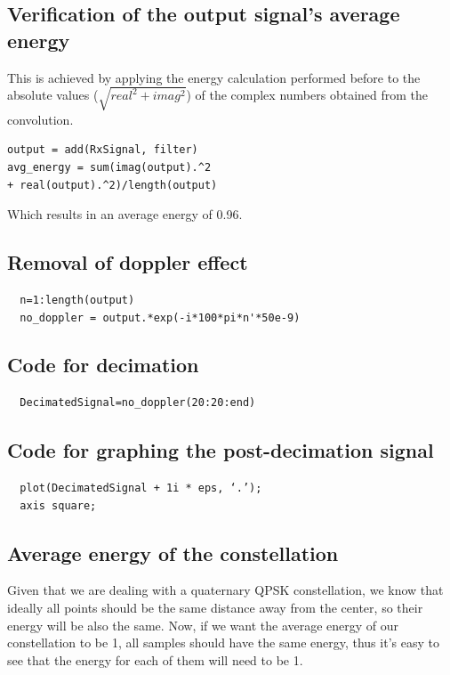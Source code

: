 \documentclass[conference,9pt]{IEEEtran}
\begin{document}
\subsection{Verification of the output signal's average energy}
This is achieved by applying the energy calculation performed before to the absolute values ($\sqrt{real^2+imag^2}$) of the complex numbers obtained from the convolution.

\begin{verbatim}
output = add(RxSignal, filter)
avg_energy = sum(imag(output).^2 
+ real(output).^2)/length(output)
\end{verbatim}

Which results in an average energy of 0.96.

\subsection{Removal of doppler effect}
\begin{verbatim}
  n=1:length(output)
  no_doppler = output.*exp(-i*100*pi*n'*50e-9)
\end{verbatim}

\subsection{Code for decimation}
\begin{verbatim}
  DecimatedSignal=no_doppler(20:20:end)
\end{verbatim}

\subsection{Code for graphing the post-decimation signal}
\begin{verbatim}
  plot(DecimatedSignal + 1i * eps, ‘.’);
  axis square;
\end{verbatim}

\subsection{Average energy of the constellation}
Given that we are dealing with a quaternary QPSK constellation, we know that ideally all points should be the same distance away from the center, so their energy will be also the same. Now, if we want the average energy of our constellation to be 1, all samples should have the same energy, thus it's easy to see that the energy for each of them will need to be 1.
\end{document}
